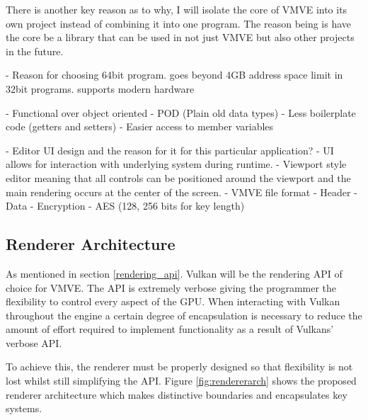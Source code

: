 \documentclass[11pt]{article}
\begin{document}
There is another key reason as to why, I will isolate the core of VMVE
into its own project instead of combining it into one program. The
reason being is have the core be a library that can be used in not
just VMVE but also other projects in the future.








- Reason for choosing 64bit program.
    goes beyond 4GB address space limit in 32bit programs.
    supports modern hardware

- Functional over object oriented
-   POD (Plain old data types)
-   Less boilerplate code (getters and setters)
-   Easier access to member variables

- Editor UI design and the reason for it for this particular application?
-   UI allows for interaction with underlying system during runtime.
-   Viewport style editor meaning that all controls can be positioned
    around the viewport and the main rendering occurs at the center of
    the screen.
- VMVE file format
-    Header
-    Data
- Encryption
- AES (128, 256 bits for key length)



\subsection{Renderer Architecture}

As mentioned in section \ref{rendering_api}. Vulkan will be the rendering API of choice
for VMVE. The API is extremely verbose giving the programmer the flexibility to
control every aspect of the GPU. When interacting with Vulkan throughout the engine
a certain degree of encapsulation is necessary to reduce the amount of effort required to 
implement functionality as a result of Vulkans' verbose API.

To achieve this, the renderer must be properly designed so that flexibility is not lost
whilst still simplifying the API. Figure \ref{fig:rendererarch} shows the proposed renderer
architecture which makes distinctive boundaries and encapsulates key systems.
\end{document}

